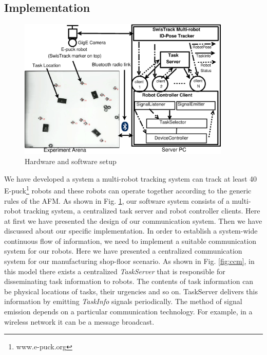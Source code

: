 \documentclass[smallcondensed]{svjour3}
\begin{document}
\subsection{Implementation}
\label{sec:impl}
\begin{figure}
\centering
\includegraphics[width=0.9\textwidth, angle=0]
{./images/RIL-Expt-Setup1.eps}
\caption{\small Hardware and software setup}
\label{fig:setup} %
\end{figure}
We have developed a system a multi-robot tracking system can track at least 40 E-puck\footnote{www.e-puck.org}  robots and these robots can operate together according to the generic rules of the AFM.
As shown in Fig. \ref{fig:setup}, our software system consists of a multi-robot tracking system, a centralized task server and robot controller clients. Here at first we have presented the design of our communication system. Then we have discussed about our specific implementation. 
In order to establish a system-wide continuous flow of information, we need to implement a suitable communication system for our robots. Here we have presented a centralized communication system for our manufacturing shop-floor scenario.
As shown in Fig. \ref{fig:ccm}, in this model there exists a centralized \textit{
TaskServer} that is responsible for disseminating task information to robots. The contents of task information can be physical locations of tasks, their urgencies and so on. TaskServer delivers this information by emitting \textit{TaskInfo} signals periodically. The method of signal emission depends on a particular communication technology. For example, in a wireless network it can be a message broadcast.
\end{document}
